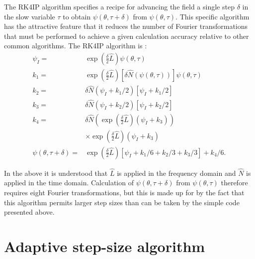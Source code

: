 The RK4IP algorithm specifies a recipe for advancing the field a single step $\delta$ in the slow variable $\tau$ to obtain $\psi(\theta,\tau+\delta)$ from $\psi(\theta,\tau)$. This specific algorithm has the attractive feature that it reduces the number of Fourier transformations that must be performed to achieve a given calculation accuracy relative to other common algorithms. The RK4IP algorithm is \cite{Hult2007}:
\begin{align}
\psi_I=&\exp\left(\frac{\delta}{2}\hat{L}\right)\psi(\theta,\tau) \\
k_1=&\exp\left(\frac{\delta}{2}\hat{L}\right)\left[\delta\hat{N}(\psi(\theta,\tau))\right]\psi(\theta,\tau) \\
k_2=&\delta\hat{N}(\psi_I+k_1/2)\left[\psi_I+k_1/2\right] \\
k_3=&\delta\hat{N}(\psi_I+k_2/2)\left[\psi_I+k_2/2\right] \\
k_4=&\delta\hat{N}\left(\exp\left(\frac{\delta}{2}\hat{L}\right)(\psi_I+k_3)\right) \\
&\times\exp\left(\frac{\delta}{2}\hat{L}\right)(\psi_I+k_3)\\
\psi(\theta,\tau+\delta)=&\exp\left(\frac{\delta}{2}\hat{L}\right)[\psi_I+k_1/6+k_2/3+k_3/3]+k_4/6.
\end{align}

In the above it is understood that $\hat{L}$ is applied in the frequency domain and $\hat{N}$ is applied in the time domain. Calculation of $\psi(\theta,\tau+\delta)$ from $\psi(\theta,\tau)$ therefore requires eight Fourier transformations, but this is made up for by the fact that this algorithm permits larger step sizes than can be taken by the simple code presented above.

\section{Adaptive step-size algorithm}

